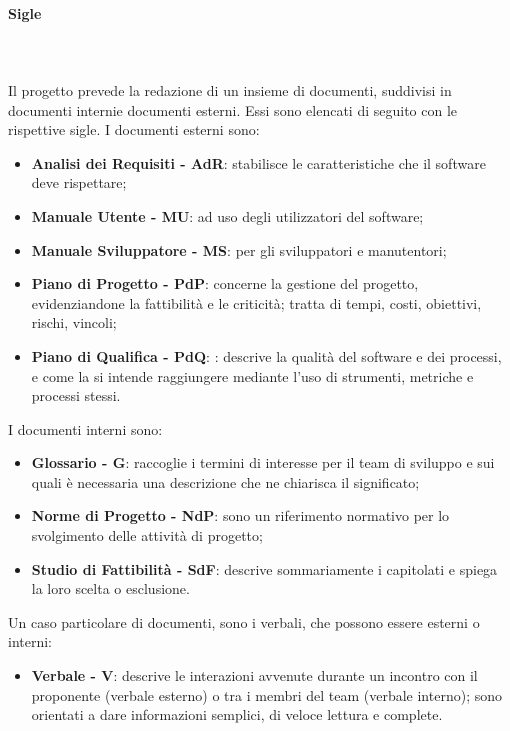 		\paragraph{Sigle} \mbox{}\\ \mbox{}\\
		Il progetto prevede la redazione di un insieme di documenti, suddivisi in documenti interni\glosp e documenti esterni\glo. Essi sono elencati di seguito con le rispettive sigle.\newline
		I documenti esterni sono:	
		\begin{itemize}
			\item \textbf{Analisi dei Requisiti - AdR}: stabilisce le caratteristiche che il software deve rispettare;
			\item \textbf{Manuale Utente - MU}: ad uso degli utilizzatori del software;
			\item \textbf{Manuale Sviluppatore - MS}: per gli sviluppatori e manutentori;
			\item \textbf{Piano di Progetto - PdP}:  concerne la gestione del progetto, evidenziandone la fattibilità e le criticità; tratta di tempi, costi, obiettivi, rischi, vincoli;
			\item \textbf{Piano di Qualifica - PdQ}: : descrive la qualità del software e dei processi, e come la si intende raggiungere mediante l'uso di strumenti, metriche e processi stessi.
		\end{itemize}
		I documenti interni sono:
		\begin{itemize}
			\item \textbf{Glossario - G}: raccoglie i termini di interesse per il team di sviluppo e sui quali è necessaria una descrizione che ne chiarisca il significato;
			\item \textbf{Norme di Progetto - NdP}: sono un riferimento normativo per lo svolgimento delle attività di progetto;
			\item \textbf{Studio di Fattibilità - SdF}: descrive sommariamente i capitolati e spiega la loro scelta o esclusione.
		\end{itemize}
		Un caso particolare di documenti, sono i verbali, che possono essere esterni o interni:
		\begin{itemize}
			\item \textbf{Verbale - V}: descrive le interazioni avvenute durante un incontro con il proponente (verbale esterno) o tra i membri del team (verbale interno); sono orientati a dare informazioni semplici, di veloce lettura e complete.
		\end{itemize}
